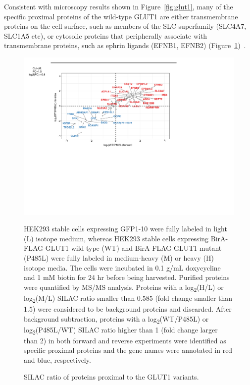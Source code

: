 Consistent with microscopy results shown in Figure~\ref{fig:glut1}, many of the specific proximal proteins of the wild-type GLUT1 are either transmembrane proteins on the cell surface, such as members of the SLC superfamily (SLC4A7, SLC1A5 etc), or cytosolic proteins that peripherally associate with transmembrane proteins, such as ephrin ligands (EFNB1, EFNB2) (Figure~\ref{fig:bioid2})~\cite{He,Himanen}. 
\begin{figure}[h]
\centering
\includegraphics[scale=0.7]{Figures/bioid2}
\caption{SILAC ratio of proteins proximal to the GLUT1 variants.}
\vspace*{-3mm}
\small \justify
HEK293 stable cells expressing GFP1-10 were fully labeled in light (L) isotope medium, whereas HEK293 stable cells expressing BirA-FLAG-GLUT1 wild-type (WT) and BirA-FLAG-GLUT1 mutant (P485L) were fully labeled in medium-heavy (M) or heavy (H) isotope media. The cells were incubated in 0.1 \textmu g/mL doxycycline and 1 mM biotin for 24 hr before being harvested. Purified proteins were quantified by MS/MS analysis. Proteins with a log\textsubscript{2}(H/L) or log\textsubscript{2}(M/L) SILAC ratio smaller than 0.585 (fold change smaller than 1.5) were considered to be background proteins and discarded. After background subtraction, proteins with a log\textsubscript{2}(WT/P485L) or log\textsubscript{2}(P485L/WT) SILAC ratio higher than 1 (fold change larger than 2) in both forward and reverse experiments were identified as specific proximal proteins and the gene names were annotated in red and blue, respectively.
\label{fig:bioid2}
\end{figure}

